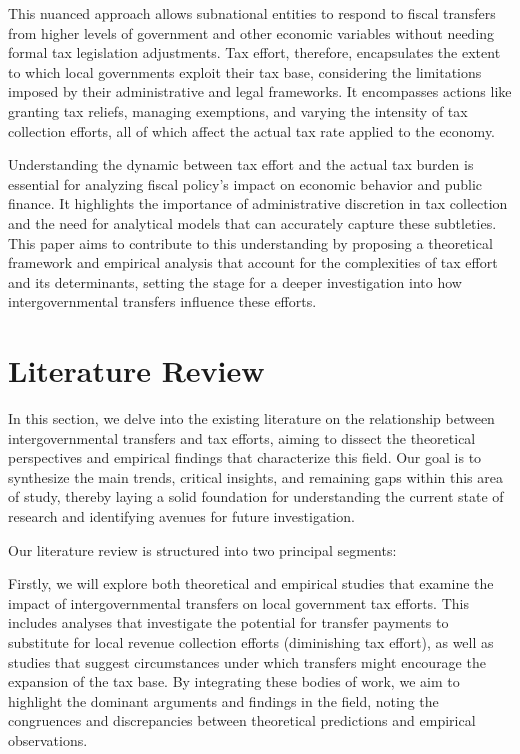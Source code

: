 This nuanced approach allows subnational entities to respond to fiscal transfers from higher levels of government and other economic variables without needing formal tax legislation adjustments. Tax effort, therefore, encapsulates the extent to which local governments exploit their tax base, considering the limitations imposed by their administrative and legal frameworks. It encompasses actions like granting tax reliefs, managing exemptions, and varying the intensity of tax collection efforts, all of which affect the actual tax rate applied to the economy.

Understanding the dynamic between tax effort and the actual tax burden is essential for analyzing fiscal policy's impact on economic behavior and public finance. It highlights the importance of administrative discretion in tax collection and the need for analytical models that can accurately capture these subtleties. This paper aims to contribute to this understanding by proposing a theoretical framework and empirical analysis that account for the complexities of tax effort and its determinants, setting the stage for a deeper investigation into how intergovernmental transfers influence these efforts.


\section{Literature Review}

In this section, we delve into the existing literature on the relationship between intergovernmental transfers and tax efforts, aiming to dissect the theoretical perspectives and empirical findings that characterize this field. Our goal is to synthesize the main trends, critical insights, and remaining gaps within this area of study, thereby laying a solid foundation for understanding the current state of research and identifying avenues for future investigation.

Our literature review is structured into two principal segments:

Firstly, we will explore both theoretical and empirical studies that examine the impact of intergovernmental transfers on local government tax efforts. This includes analyses that investigate the potential for transfer payments to substitute for local revenue collection efforts (diminishing tax effort), as well as studies that suggest circumstances under which transfers might encourage the expansion of the tax base. By integrating these bodies of work, we aim to highlight the dominant arguments and findings in the field, noting the congruences and discrepancies between theoretical predictions and empirical observations.

